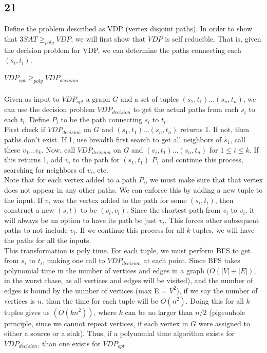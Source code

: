 \documentclass[letterpaper,notitlepage,twoside]{article}
\begin{document}
\subsection*{21}
Define the problem described as VDP (vertex disjoint paths). In order to show that $3SAT \geq _{poly} VDP$, we will first show that $VDP$ is self reducible. That is, given the decision problem for VDP, we can determine the paths connecting each $(s_i, t_i)$. \\\\
$VDP_{opt} \geq _{poly} VDP_{decision}$\\\\
Given as input to $VDP_{opt}$ a graph $G$ and a set of tuples $(s_1, t_1) ... (s_n, t_n)$, we can use the decision problem $VDP_{decision}$ to get the actual paths from each $s_i$ to each $t_i$. Define $P_i$ to be the path connecting $s_i$ to $t_i$. \\
First check if $VDP_{decision}$ on $G$ and $(s_1, t_1) ... (s_n, t_n)$ returns 1. If not, then paths don't exist. If 1, use breadth first search to get all neighbors of $s_1$, call these $v_1...v_k$. Now, call $VDP_{decision}$ on $G$ and $(v_i, t_1) ... (s_n, t_n)$ for $1\leq i \leq k$. If this returns 1, add $v_i$ to the path for $(s_1, t_1)$ $P_1$ and continue this process, searching for neighbors of $v_i$, etc. \\
Note that for each vertex added to a path $P_i$, we must make sure that that vertex does not appear in any other paths. We can enforce this by adding a new tuple to the input. If $v_i$ was the vertex added to the path for some $(s_i, t_i)$, then construct a new $(s, t)$ to be $(v_i, v_i)$. Since the shortest path from $v_i$ to $v_i$, it will always be an option to have its path be just $v_i$. This forces other subsequent paths to not include $v_i$. If we continue this process for all $k$ tuples, we will have the paths for all the inputs. \\
This transformation is poly time. For each tuple, we must perform BFS to get from $s_i$ to $t_i$, making one call to $VDP_{decision}$ at each point. Since BFS takes polynomial time in the number of vertices and edges in a graph ($O(|V| + |E|)$, in the worst chase, as all vertices and edges will be visited), and the number of edges is bound by the number of vertices (max E = $V^2$), if we say the number of vertices is $n$, than the time for each tuple will be $O(n^2)$. Doing this for all $k$ tuples gives us $(O(kn^2))$, where $k$ can be no larger than $n/2$ (pigeonhole principle, since we cannot repeat vertices, if each vertex in $G$ were assigned to either a source or a sink). Thus, if a polynomial time algorithm exists for $VDP_{decision}$, than one exists for $VDP_{opt}$. \\\\
\end{document}
